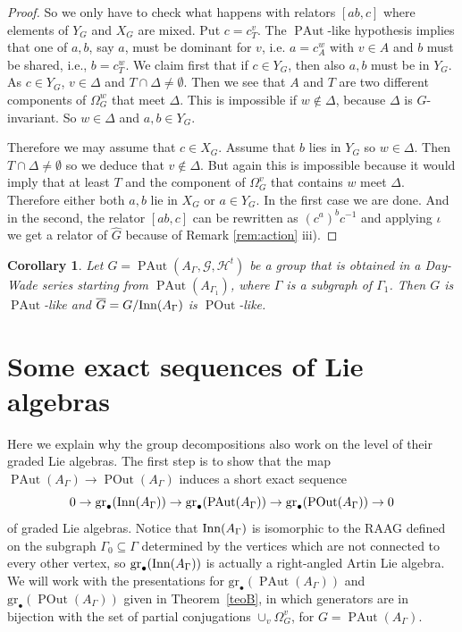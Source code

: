 \documentclass[10pt]{amsart}
\newtheorem{corollary}[theorem]{Corollary}
\theoremstyle{definition}
\newcommand{\Inn}{{\rm Inn}}
\newcommand{\PAut}{\operatorname{PAut}}
\newcommand{\POut}{\operatorname {POut}}
\newcommand{\gr}{\mathrm{gr}_\bullet}
\theoremstyle{definition}
\numberwithin{equation}{section}
\begin{document}
\begin{proof}
So we only have to check what happens with relators $[ab,c]$ where elements of $Y_G$ and $X_G$ are mixed. Put $c=c^v_T$. The $\PAut$-like hypothesis implies that one of $a,b$, say $a$, must be dominant for $v$, i.e. $a=c^w_A$ with $v\in A$ and $b$ must be shared, i.e., $b=c^w_T$. We claim first that if $c\in Y_G$, then also $a,b$ must be in $Y_G$.  As $c\in Y_G$, $v\in\Delta$ and $T\cap\Delta\neq\emptyset$. Then we see that $A$ and $T$ are two different components of $\Omega^w_G$ that meet $\Delta$. This is impossible if   $w\not\in\Delta$,  because $\Delta$ is $G$-invariant. So $w\in\Delta$ and $a,b\in Y_G$.

Therefore we may assume that $c\in X_G$. Assume that $b$ lies in $Y_G$ so $w\in\Delta$. Then $T\cap\Delta\neq\emptyset$ so we deduce that $v\not\in\Delta$. But again this is impossible because it would imply that at least $T$ and the component of $\Omega_G^v$ that contains $w$ meet $\Delta$. Therefore either both $a,b$ lie in $X_G$ or $a\in Y_G$. In the first case we are done.  And in the second, the relator $[ab,c]$ can be rewritten as  $(c^a)^bc^{-1}$ and applying $\iota$ we get a relator of $\hat G$ because of Remark \ref{rem:action} iii).
\end{proof}


\begin{corollary} Let $G=\PAut(A_\Gamma,\mathcal{G},\mathcal{H}^t)$ be a group that is obtained in a Day-Wade series starting from $\PAut(A_{\Gamma_1})$, where $\Gamma$ is a subgraph of $\Gamma_1$. Then $G$ is $\PAut$-like and $\overline{G}=G/\Inn(A_\Gamma)$ is $\POut$-like.
\end{corollary}


\section{Some exact sequences of Lie algebras}

Here we explain why the group decompositions also work on the level of their graded Lie algebras. The first step is to show that the map $\PAut(A_{\Gamma}) \to \POut(A_\Gamma)$ induces a short exact sequence
\[ 0\to \gr(\Inn(A_\Gamma))\to\gr(\PAut(A_\Gamma))\to\gr(\POut(A_{\Gamma}))\to 0\]
of graded Lie algebras. Notice that $\Inn(A_\Gamma)$ is isomorphic to the RAAG defined on the subgraph $\Gamma_0 \subseteq \Gamma$ determined by the vertices which are not connected to every other vertex, so $\gr(\Inn(A_\Gamma))$ is actually a right-angled Artin Lie algebra. We will work with the presentations for $\gr(\PAut(A_\Gamma))$ and $\gr(\POut(A_\Gamma))$ given in Theorem~\ref{teoB}, in which generators are in bijection with the set of partial conjugations $\cup_v \Omega_G^v$, for $G = \PAut(A_\Gamma)$.
\end{document}
